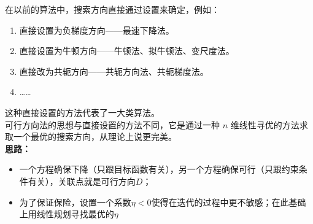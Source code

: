 在以前的算法中，搜索方向直接通过设置来确定，例如：
\begin{enumerate}
    \item 直接设置为负梯度方向——最速下降法。
    \item 直接设置为牛顿方向——牛顿法、拟牛顿法、变尺度法。
    \item 直接改为共轭方向——共轭方向法、共轭梯度法。
    \item ……
\end{enumerate}
这种直接设置的方法代表了一大类算法。\\
可行方向法的思想与直接设置的方法不同，它是通过一种 \(n\) 维线性寻优的方法求取一个最优的搜索方向，从理论上说更完美。
\\\textbf{思路：}\\
\begin{itemize}
    \item 一个方程确保下降（只跟目标函数有关），另一个方程确保可行（只跟约束条件有关），关联点就是可行方向$D$；
    \item 为了保证保险，设置一个系数$\eta<0$使得在迭代的过程中更不敏感；在此基础上用线性规划寻找最优的$\eta$
\end{itemize}
